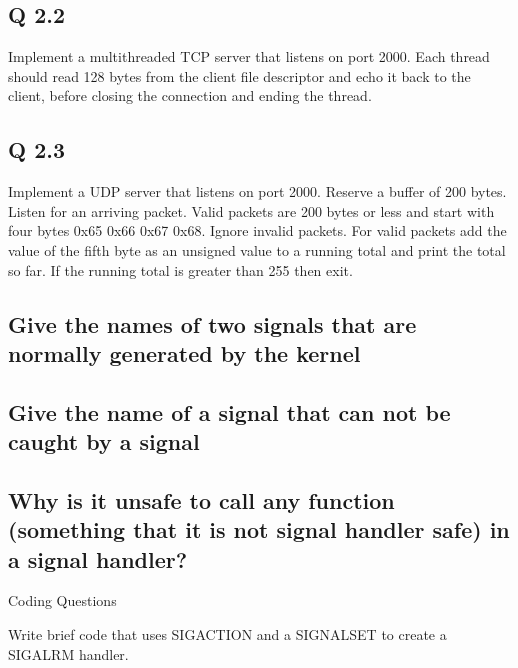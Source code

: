\subsection{Q 2.2}\label{q-2.2}

Implement a multithreaded TCP server that listens on port 2000. Each
thread should read 128 bytes from the client file descriptor and echo it
back to the client, before closing the connection and ending the thread.

\subsection{Q 2.3}\label{q-2.3}

Implement a UDP server that listens on port 2000. Reserve a buffer of
200 bytes. Listen for an arriving packet. Valid packets are 200 bytes or
less and start with four bytes 0x65 0x66 0x67 0x68. Ignore invalid
packets. For valid packets add the value of the fifth byte as an
unsigned value to a running total and print the total so far. If the
running total is greater than 255 then exit.

\subsection{Give the names of two signals that are normally generated by
the
kernel}\label{give-the-names-of-two-signals-that-are-normally-generated-by-the-kernel}

\subsection{Give the name of a signal that can not be caught by a
signal}\label{give-the-name-of-a-signal-that-can-not-be-caught-by-a-signal}

\subsection{Why is it unsafe to call any function (something that it is
not signal handler safe) in a signal
handler?}\label{why-is-it-unsafe-to-call-any-function-something-that-it-is-not-signal-handler-safe-in-a-signal-handler}

Coding Questions

Write brief code that uses SIGACTION and a SIGNALSET to create a SIGALRM
handler.
